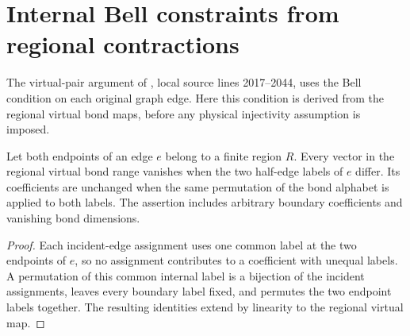 \section{Internal Bell constraints from regional contractions}%
\label{sec:peps_vertex_bond_region_constraint}

The virtual-pair argument of
\cite[Section~IV.C.1]{Cirac2021Matrix}, local source lines 2017--2044,
uses the Bell condition on each original graph edge. Here this condition
is derived from the regional virtual bond maps, before any
physical injectivity assumption is imposed.

\begin{lemma}%
    \label{thm:peps_region_virtual_internal_bond}
    \leanok
    Let both endpoints of an edge $e$ belong to a finite region $R$.
    Every vector in the regional virtual bond range vanishes
    when the two half-edge labels of $e$ differ. Its coefficients
    are unchanged when the same permutation of the bond alphabet
    is applied to both labels. The assertion includes arbitrary
    boundary coefficients and vanishing bond dimensions.
\end{lemma}

\begin{proof}\leanok
    Each incident-edge assignment uses one common label at the two
    endpoints of $e$, so no assignment contributes to a coefficient
    with unequal labels. A permutation of this common internal label
    is a bijection of the incident assignments, leaves every boundary
    label fixed, and permutes the two endpoint labels together.
    The resulting identities extend by linearity to the
    regional virtual map.
\end{proof}

